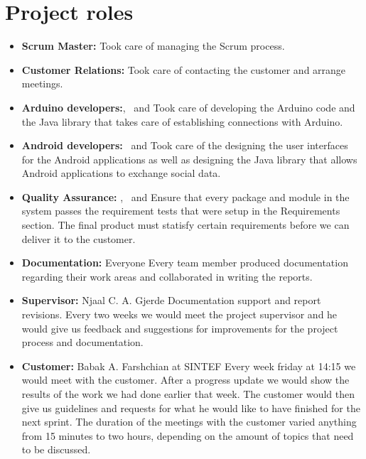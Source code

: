 \section{Project roles}
\begin{itemize}
	\item \textbf{Scrum Master:} \henrik\newline
		Took care of managing the Scrum process.
	
	\item \textbf{Customer Relations:} \henrik\newline
		Took care of contacting the customer and arrange meetings.

	\item \textbf{Arduino developers:}\anders, \bjornar ~and \johan\newline
		Took care of developing the Arduino code and the Java library that takes
		care of establishing connections with Arduino.

	\item \textbf{Android developers:}  \emanuele~and \henrik\newline
		Took care of the designing the user interfaces for the Android applications
		as well as designing the Java library that allows Android applications
		to exchange social data.
	
	\item \textbf{Quality Assurance:} \johan, \asbjorn~and \jonas\newline
		Ensure that every package and module in the system passes the requirement tests
		that were setup in the Requirements section. The final product must statisfy certain
		requirements before we can deliver it to the customer.

	\item \textbf{Documentation:} Everyone\newline
		Every team member produced documentation regarding their work areas and
		collaborated in writing the reports.

	\item \textbf{Supervisor:} Njaal C. A. Gjerde\newline
		Documentation support and report revisions. Every two weeks we would meet the project supervisor
	 	and he would give us feedback and suggestions for improvements for the project process and documentation.

	\item \textbf{Customer:} Babak A. Farshchian at SINTEF \newline
		Every week friday at 14:15 we would meet with the customer. After a progress update we would show the results
		of the work we had done earlier that week. The customer would then give us guidelines and requests for what
		he would like to have finished for the next sprint. The duration of the meetings with the customer varied anything
		from 15 minutes to two hours, depending on the amount of topics that need to be discussed.
\end{itemize}

